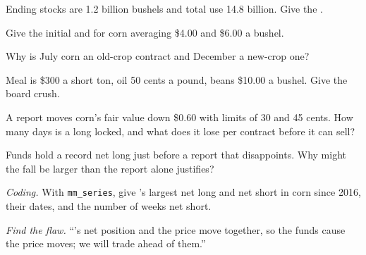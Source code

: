 \begin{exercise}[$\star$]\label{exo:m3:agriculturals-and-softs:1}
Ending stocks are 1.2 billion bushels and total use 14.8 billion. Give the .
\end{exercise}

\begin{exercise}[$\star$]\label{exo:m3:agriculturals-and-softs:2}
Give the initial and  for corn averaging \$4.00 and \$6.00 a bushel.
\end{exercise}

\begin{exercise}[$\star$]\label{exo:m3:agriculturals-and-softs:3}
Why is July corn an old-crop contract and December a new-crop one?
\end{exercise}

\begin{exercise}[$\star\star$]\label{exo:m3:agriculturals-and-softs:4}
Meal is \$300 a short ton, oil 50 cents a pound, beans \$10.00 a bushel. Give the board crush.
\end{exercise}

\begin{exercise}[$\star\star$]\label{exo:m3:agriculturals-and-softs:5}
A report moves corn's fair value down \$0.60 with limits of 30 and 45 cents. How many days is a long
locked, and what does it lose per contract before it can sell?
\end{exercise}

\begin{exercise}[$\star\star$]\label{exo:m3:agriculturals-and-softs:6}
Funds hold a record net long just before a report that disappoints. Why might the fall be larger than
the report alone justifies?
\end{exercise}

\begin{exercise}[$\star\star\star$]\label{exo:m3:agriculturals-and-softs:7}
\emph{Coding.} With \texttt{mm\_series}, give 's largest net long and net short in corn
since 2016, their dates, and the number of weeks net short.
\end{exercise}

\begin{exercise}[$\star\star\star$]\label{exo:m3:agriculturals-and-softs:8}
\emph{Find the flaw.} ``'s net position and the price move together, so the funds cause
the price moves; we will trade ahead of them.''
\end{exercise}

